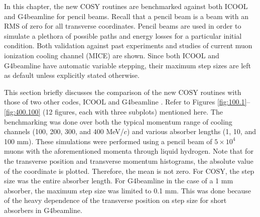 \par In this chapter, the new COSY routines are benchmarked against both ICOOL and G4beamline for pencil beams. Recall that a pencil beam is a beam with an RMS of zero for all transverse coordinates. Pencil beams are used in order to simulate a plethora of possible paths and energy losses for a particular initial condition. Both validation against past experiments and studies of current muon ionization cooling channel (MICE) are shown. Since both ICOOL and G4beamline have automatic variable stepping, their maximum step sizes are left as default unless explicitly stated otherwise.

\label{sec:benchmark}

This section briefly discusses the comparison of the new COSY routines with those of two other codes, ICOOL \cite{icool} and G4beamline \cite{g4bl}. Refer to Figures \ref{fig:100.1}--\ref{fig:400.100} (12 figures, each with three subplots) mentioned here. The benchmarking was done over both the typical momentum range of cooling channels (100, 200, 300, and 400 MeV/$c$) and various absorber lengths (1, 10, and 100 mm). These simulations were performed using a pencil beam of $5\times 10^4$ muons with the aforementioned momenta through liquid hydrogen. Note that for the transverse position and transverse momentum histograms, the absolute value of the coordinate is plotted. Therefore, the mean is not zero. For COSY, the step size was the entire absorber length. For G4beamline in the case of a 1 mm absorber, the maximum step size was limited to 0.1 mm. This was done because of the heavy dependence of the transverse position on step size for short absorbers in G4beamline.
\newpage
